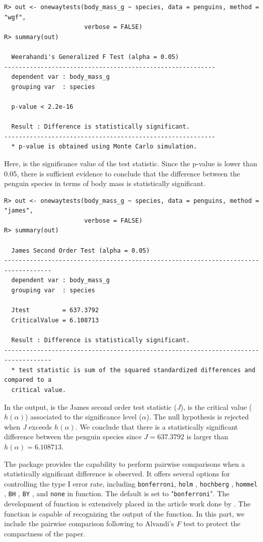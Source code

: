 \begin{verbatim}
R> out <- onewaytests(body_mass_g ~ species, data = penguins, method = "wgf", 
                      verbose = FALSE)
R> summary(out)

  Weerahandi's Generalized F Test (alpha = 0.05) 
---------------------------------------------------------- 
  dependent var : body_mass_g 
  grouping var  : species 

  p-value < 2.2e-16

  Result : Difference is statistically significant. 
---------------------------------------------------------- 
  * p-value is obtained using Monte Carlo simulation. 
\end{verbatim}

Here,  is the significance value of the test statistic. Since the p-value is lower than 0.05, there is sufficient evidence to conclude that the difference between the penguin species in terms of body mass is statistically significant. 

\begin{verbatim}
R> out <- onewaytests(body_mass_g ~ species, data = penguins, method = "james", 
                      verbose = FALSE)
R> summary(out)

  James Second Order Test (alpha = 0.05) 
----------------------------------------------------------------------------------- 
  dependent var : body_mass_g 
  grouping var  : species 

  Jtest         = 637.3792 
  CriticalValue = 6.108713 

  Result : Difference is statistically significant. 
----------------------------------------------------------------------------------- 
  * test statistic is sum of the squared standardized differences and compared to a 
  critical value. 
\end{verbatim}

In the output,  is the James second order test statistic (\textit{J}),  is the critical value ($h(\alpha)$) associated to the significance level ($\alpha$). The null hypothesis is rejected when \textit{J} exceeds $h(\alpha)$. We conclude that there is a statistically significant difference between the penguin species since $\textit{J} = 637.3792$ is larger than $h(\alpha) = 6.108713$.

The  package provides the capability to perform pairwise comparisons when a statistically significant difference is observed. It offers several options for controlling the type I error rate, including  \texttt{bonferroni}, \texttt{holm} \citep{holm1979}, \texttt{hochberg} \citep{hochberg1988}, \texttt{hommel} \citep{hommel1988}, \texttt{BH} \citep{benjamini1995}, \texttt{BY} \citep{benjamini2001}, and \texttt{none} in  function. The default is set to "\texttt{bonferroni}". The development of  function is extensively placed in the article work done by \cite{dag2018onewaytests}. The  function is capable of recognizing the output of the  function. In this part, we include the pairwise comparison following to Alvandi's \textit{F} test to protect the compactness of the paper. 


